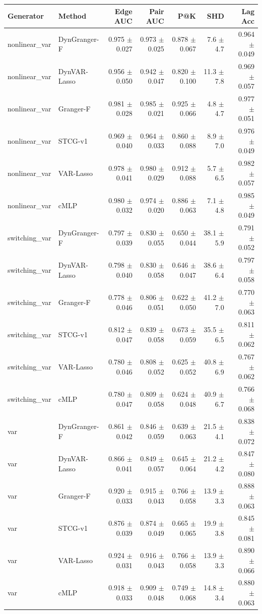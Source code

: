 \begin{tabular}{llrrrrr}
\toprule
Generator & Method & Edge AUC & Pair AUC & P@K & SHD & Lag Acc \\
\midrule
nonlinear_var & DynGranger-F & 0.975 $\pm$ 0.027 & 0.973 $\pm$ 0.025 & 0.878 $\pm$ 0.067 & 7.6 $\pm$ 4.7 & 0.964 $\pm$ 0.049 \\
nonlinear_var & DynVAR-Lasso & 0.956 $\pm$ 0.050 & 0.942 $\pm$ 0.047 & 0.820 $\pm$ 0.100 & 11.3 $\pm$ 7.8 & 0.969 $\pm$ 0.057 \\
nonlinear_var & Granger-F & 0.981 $\pm$ 0.028 & 0.985 $\pm$ 0.021 & 0.925 $\pm$ 0.066 & 4.8 $\pm$ 4.7 & 0.977 $\pm$ 0.051 \\
nonlinear_var & STCG-v1 & 0.969 $\pm$ 0.040 & 0.964 $\pm$ 0.033 & 0.860 $\pm$ 0.088 & 8.9 $\pm$ 7.0 & 0.976 $\pm$ 0.049 \\
nonlinear_var & VAR-Lasso & 0.978 $\pm$ 0.041 & 0.980 $\pm$ 0.029 & 0.912 $\pm$ 0.088 & 5.7 $\pm$ 6.5 & 0.982 $\pm$ 0.057 \\
nonlinear_var & cMLP & 0.980 $\pm$ 0.032 & 0.974 $\pm$ 0.020 & 0.886 $\pm$ 0.063 & 7.1 $\pm$ 4.8 & 0.985 $\pm$ 0.049 \\
switching_var & DynGranger-F & 0.797 $\pm$ 0.039 & 0.830 $\pm$ 0.055 & 0.650 $\pm$ 0.044 & 38.1 $\pm$ 5.9 & 0.791 $\pm$ 0.052 \\
switching_var & DynVAR-Lasso & 0.798 $\pm$ 0.040 & 0.830 $\pm$ 0.058 & 0.646 $\pm$ 0.047 & 38.6 $\pm$ 6.4 & 0.797 $\pm$ 0.058 \\
switching_var & Granger-F & 0.778 $\pm$ 0.046 & 0.806 $\pm$ 0.051 & 0.622 $\pm$ 0.050 & 41.2 $\pm$ 7.0 & 0.770 $\pm$ 0.063 \\
switching_var & STCG-v1 & 0.812 $\pm$ 0.047 & 0.839 $\pm$ 0.058 & 0.673 $\pm$ 0.059 & 35.5 $\pm$ 6.5 & 0.811 $\pm$ 0.062 \\
switching_var & VAR-Lasso & 0.780 $\pm$ 0.046 & 0.808 $\pm$ 0.052 & 0.625 $\pm$ 0.052 & 40.8 $\pm$ 6.9 & 0.767 $\pm$ 0.062 \\
switching_var & cMLP & 0.780 $\pm$ 0.047 & 0.809 $\pm$ 0.058 & 0.624 $\pm$ 0.048 & 40.9 $\pm$ 6.7 & 0.766 $\pm$ 0.068 \\
var & DynGranger-F & 0.861 $\pm$ 0.042 & 0.846 $\pm$ 0.059 & 0.639 $\pm$ 0.063 & 21.5 $\pm$ 4.1 & 0.838 $\pm$ 0.072 \\
var & DynVAR-Lasso & 0.866 $\pm$ 0.041 & 0.849 $\pm$ 0.057 & 0.645 $\pm$ 0.064 & 21.2 $\pm$ 4.2 & 0.847 $\pm$ 0.080 \\
var & Granger-F & 0.920 $\pm$ 0.033 & 0.915 $\pm$ 0.043 & 0.766 $\pm$ 0.058 & 13.9 $\pm$ 3.3 & 0.888 $\pm$ 0.063 \\
var & STCG-v1 & 0.876 $\pm$ 0.039 & 0.874 $\pm$ 0.049 & 0.665 $\pm$ 0.065 & 19.9 $\pm$ 3.8 & 0.845 $\pm$ 0.081 \\
var & VAR-Lasso & 0.924 $\pm$ 0.031 & 0.916 $\pm$ 0.043 & 0.766 $\pm$ 0.058 & 13.9 $\pm$ 3.3 & 0.890 $\pm$ 0.066 \\
var & cMLP & 0.918 $\pm$ 0.033 & 0.909 $\pm$ 0.048 & 0.749 $\pm$ 0.068 & 14.8 $\pm$ 3.4 & 0.880 $\pm$ 0.063 \\
\bottomrule
\end{tabular}
